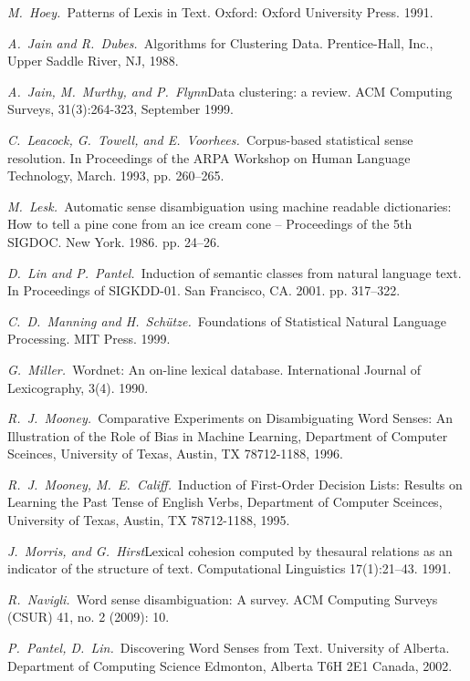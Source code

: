 \documentclass{article}
\begin{document}
\begin{articletext}
\begin{thebibliography}{9}
\textit{M.~Hoey.~}Patterns of Lexis in Text. Oxford: Oxford University Press. 1991. 

\textit{A.~Jain and R.~Dubes.~}Algorithms for Clustering Data. Prentice-Hall, Inc., Upper Saddle River, NJ, 1988.

\textit{A.~Jain, M.~Murthy, and P.~Flynn}Data clustering: a review. ACM Computing Surveys, 31(3):264-323, September 1999.

\textit{C.~Leacock, G.~Towell, and E.~Voorhees.~}Corpus-based statistical sense resolution. In Proceedings of the ARPA Workshop on Human Language Technology, March. 1993, pp. 260–265.  

\textit{M.~Lesk.~}Automatic sense disambiguation using machine readable dictionaries: How to tell a pine cone from an ice cream cone --  Proceedings  of  the 5th SIGDOC. New York. 1986. pp. 24–26. 

\textit{D.~Lin and P.~Pantel.~}Induction of semantic classes from natural language text. In Proceedings of SIGKDD-01. San Francisco, CA. 2001. pp. 317–322.   

\textit{C.~D.~Manning and H.~Sch\"utze.~}Foundations of Statistical Natural Language Processing. MIT Press. 1999.

\textit{G.~Miller.~}Wordnet: An on-line lexical database. International Journal of Lexicography, 3(4). 1990.

\textit{R.~J.~Mooney.~}Comparative Experiments on Disambiguating Word Senses:
An Illustration of the Role of Bias in Machine Learning, Department of Computer Sceinces, University of Texas, Austin, TX 78712-1188, 1996.

\textit{R.~J.~Mooney, M.~E.~Califf.~}Induction of First-Order Decision Lists: Results on Learning the Past Tense of English Verbs, Department of Computer Sceinces, University of Texas, Austin, TX 78712-1188, 1995.

\textit{J.~Morris, and G.~Hirst}Lexical cohesion computed by thesaural relations as an indicator of the structure of text. Computational Linguistics 17(1):21–43. 1991. 

\textit{R.~Navigli.~}Word sense disambiguation: A survey. ACM Computing Surveys (CSUR) 41, no. 2 (2009): 10.

\textit{P.~Pantel, D.~Lin.~}Discovering Word Senses from Text. University of Alberta. Department of Computing Science Edmonton, Alberta T6H 2E1 Canada, 2002.


\end{thebibliography}
\end{articletext}
\end{document}
